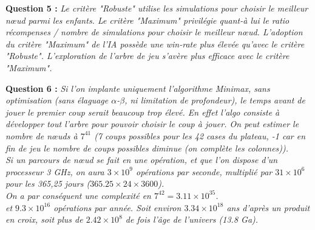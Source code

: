 \documentclass[a4paper,11pt]{article}
\begin{document}
        \textbf{Question 5 : }\textit{Le critère "Robuste" utilise les simulations pour choisir le meilleur nœud parmi les enfants. Le critère "Maximum" privilégie quant-à lui le ratio récompenses / nombre de simulations pour choisir le meilleur nœud. L'adoption du critère "Maximum" de l'IA possède une win-rate plus élevée qu'avec le critère "Robuste". L'exploration de l'arbre de jeu s'avère plus efficace avec le critère "Maximum".\\}       			 
        
        \textbf{Question 6 : }\textit{Si l'on implante uniquement l'algorithme Minimax, sans optimisation (sans élaguage $\alpha$-$\beta$, ni limitation de profondeur), le temps avant de jouer le premier coup serait beaucoup trop élevé. En effet l'algo consiste à développer tout l'arbre pour pouvoir choisir le coup à jouer. On peut estimer le nombre de nœuds à $7^{41}$ (7 coups possibles pour les 42 cases du plateau, -1 car en fin de jeu le nombre de coups possibles diminue (on complète les colonnes)).\\
        Si un parcours de nœud se fait en une opération, et que l'on dispose d'un processeur 3 GHz, on aura $3\times 10^9$ opérations par seconde, multiplié par $31 \times 10^6$ pour les 365,25 jours ($365.25 \times 24 \times 3600$). \\On a par conséquent une complexité en $7^{42} = 3.11\times 10^{35} $. \\et $9.3\times 10^{16}$ opérations par année. Soit environ $3.34\times 10^{18}$ ans d'après un produit en croix, soit plus de $2.42\times 10^8 $ de fois l'âge de l'univers (13.8 Ga).\\}
\end{document}
